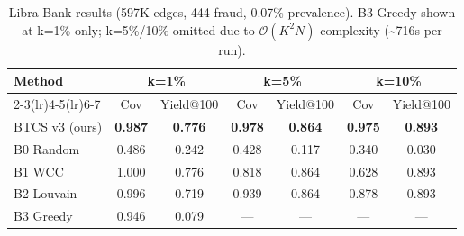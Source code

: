 \begin{table}[t]
\centering
\caption{Libra Bank results (597K edges, 444 fraud, 0.07\% prevalence). B3 Greedy shown at k=1\% only; k=5\%/10\% omitted due to $\mathcal{O}(K^2 N)$ complexity (\textasciitilde 716s per run).}
\label{tab:libra_results}
\begin{tabular}{lcccccc}
\toprule
\textbf{Method} & \multicolumn{2}{c}{\textbf{k=1\%}} & \multicolumn{2}{c}{\textbf{k=5\%}} & \multicolumn{2}{c}{\textbf{k=10\%}} \\
\cmidrule(lr){2-3}\cmidrule(lr){4-5}\cmidrule(lr){6-7}
 & Cov & Yield@100 & Cov & Yield@100 & Cov & Yield@100 \\
\midrule
BTCS v3 (ours) & \textbf{0.987} & \textbf{0.776} & \textbf{0.978} & \textbf{0.864} & \textbf{0.975} & \textbf{0.893} \\
B0 Random & 0.486 & 0.242 & 0.428 & 0.117 & 0.340 & 0.030 \\
B1 WCC & 1.000 & 0.776 & 0.818 & 0.864 & 0.628 & 0.893 \\
B2 Louvain & 0.996 & 0.719 & 0.939 & 0.864 & 0.878 & 0.893 \\
B3 Greedy & 0.946 & 0.079 & --- & --- & --- & --- \\
\bottomrule
\end{tabular}
\end{table}

